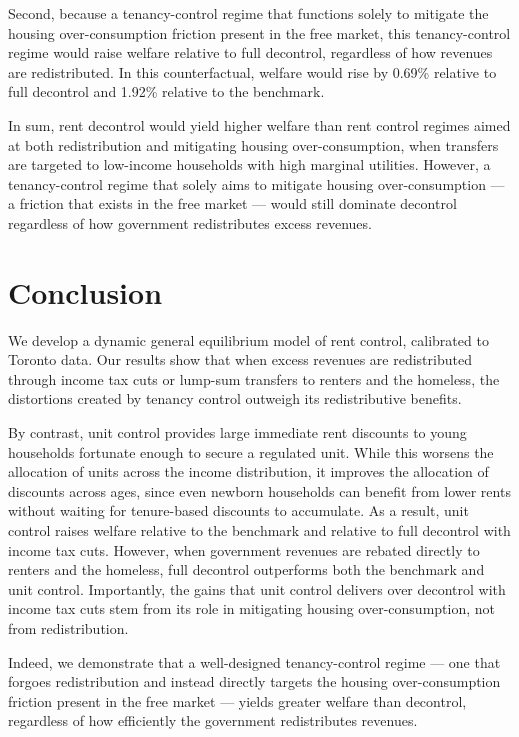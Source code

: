 \documentclass[parskip=full]{article}
\begin{document}
Second, because a tenancy-control regime that functions solely to mitigate the housing over-consumption friction present in the free market, this tenancy-control regime would raise welfare relative to full decontrol, regardless of how revenues are redistributed. In this counterfactual, welfare would rise by 0.69\% relative to full decontrol and 1.92\% relative to the benchmark.

In sum, rent decontrol would yield higher welfare than rent control regimes aimed at both redistribution and mitigating housing over-consumption, when transfers are targeted to low-income households with high marginal utilities. However, a tenancy-control regime that solely aims to mitigate housing over-consumption — a friction that exists in the free market — would still dominate decontrol regardless of how government redistributes excess revenues. 

\section{Conclusion}\label{sec:conclusion}

We develop a dynamic general equilibrium model of rent control, calibrated to Toronto data. Our results show that when excess revenues are redistributed through income tax cuts or lump-sum transfers to renters and the homeless, the distortions created by tenancy control outweigh its redistributive benefits.

By contrast, unit control provides large immediate rent discounts to young households fortunate enough to secure a regulated unit. While this worsens the allocation of units across the income distribution, it improves the allocation of discounts across ages, since even newborn households can benefit from lower rents without waiting for tenure-based discounts to accumulate. As a result, unit control raises welfare relative to the benchmark and relative to full decontrol with income tax cuts. However, when government revenues are rebated directly to renters and the homeless, full decontrol outperforms both the benchmark and unit control. Importantly, the gains that unit control delivers over decontrol with income tax cuts stem from its role in mitigating housing over-consumption, not from redistribution.

Indeed, we demonstrate that a well-designed tenancy-control regime — one that forgoes redistribution and instead directly targets the housing over-consumption friction present in the free market — yields greater welfare than decontrol, regardless of how efficiently the government redistributes revenues. 
\end{document}
